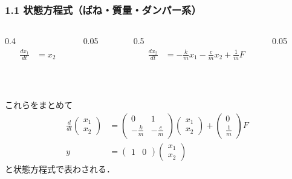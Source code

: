 \begin{frame}[t]
\frametitle{1.1 状態方程式（ばね・質量・ダンパー系）}
\vspace*{-5mm}
\setcounter{eqncountersave}{\value{equation}} %
\addtocounter{equation}{-2} %
\begin{columns}[t]
\begin{column}{0.4\textwidth}
\begin{align}
  \frac{dx_1}{dt} &= x_2
\end{align}
\end{column}
\begin{column}{0.05\textwidth}

\end{column}
\begin{column}{0.5\textwidth}
\begin{align}
  \frac{dx_2}{dt} &= -\frac{k}{m} x_1 - \frac{c}{m} x_2 + \frac{1}{m} F
\end{align}
\end{column}
\begin{column}{0.05\textwidth}

\end{column}
\end{columns}
\ \\[5mm]
\setcounter{equation}{\value{eqncountersave}} %

これらをまとめて
\begin{align}
 \frac{d}{dt} \left(\begin{array}{c}
               x_1 \\
         x_2
        \end{array}\right)
 &=
 \left(\begin{array}{cc}
        0            &         1     \\
  -\frac{k}{m} & - \frac{c}{m}
       \end{array}\right)
 \left(\begin{array}{c}
  x_1 \\
  x_2
       \end{array}\right)
 +
 \left(\begin{array}{c}
        0 \\
  \frac{1}{m}
       \end{array}\right)
 F \label{eq:massstate} \\
 y &=
 \left(\begin{array}{cc}
             1 & 0
       \end{array}\right)
 \left(\begin{array}{c}
        x_1 \\
  x_2
       \end{array}\right) \label{eq:massoutput}
\end{align}
と状態方程式で表わされる．
\end{frame}

